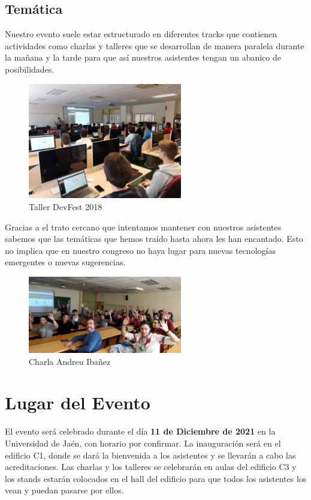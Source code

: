 \documentclass[12pt]{article}
\begin{document}
\subsection{Temática}
Nuestro evento suele estar estructurado en diferentes tracks que contienen actividades como charlas y talleres que se desarrollan de manera paralela durante la mañana y la tarde para que así nuestros asistentes tengan un abanico de posibilidades.
\begin{figure}[h]
    \centering
    \includegraphics[width=0.6\textwidth]{Taller.jpg}
    \caption{Taller DevFest 2018}
    \label{fig:my_label}
\end{figure}


Gracias a el trato cercano que intentamos mantener con nuestros asistentes sabemos que las temáticas que hemos traído hasta ahora les han encantado. Esto no implica que en nuestro congreso no haya lugar para nuevas tecnologías emergentes o nuevas sugerencias.

\begin{figure}[h]
    \centering
    \includegraphics[width=0.6\textwidth]{Foto Charla.jpg}
    \caption{Charla Andreu Ibañez}
    \label{fig:my_label}
\end{figure}
\section{Lugar del Evento}

El evento será celebrado durante el día \textbf{11 de Diciembre de 2021} en la Universidad de Jaén, con horario por confirmar. La inauguración será en el edificio C1, donde se dará la bienvenida a los asistentes
y se llevarán a cabo las acreditaciones. Las charlas y los talleres se celebrarán en aulas del edificio C3 y los stands estarán colocados en el hall del edificio para que todos los asistentes los vean y puedan pasarse por ellos. 
\end{document}
